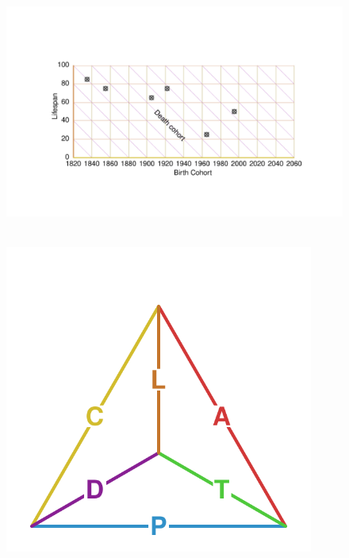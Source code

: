 \documentclass[12pt,oneside,a4paper,doublespacing]{article} %
\theoremstyle{definition}
\begin{document}
\begin{figure}[h!] 
\caption{~}
\includegraphics[scale=0.8]{LCDrt.pdf}
\end{figure} 

\begin{figure}[h!]
\centering
\caption{~}
\includegraphics[width=4in]{TetraHedronEdgesOnly.pdf}%
\end{figure}
\end{document}
